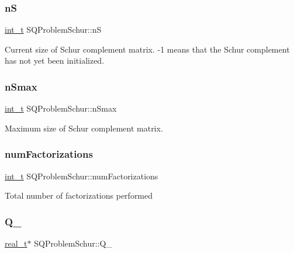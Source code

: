 \subsubsection{\texorpdfstring{nS}{nS}}
{\footnotesize\ttfamily \hyperlink{_types_8hpp_ab6fd6105e64ed14a0c9281326f05e623}{int\+\_\+t} S\+Q\+Problem\+Schur\+::nS\hspace{0.3cm}{\ttfamily [protected]}}

Current size of Schur complement matrix. -\/1 means that the Schur complement has not yet been initialized. \mbox{\label{class_s_q_problem_schur_ae21ef6e09c14c15a1b3aa9e6b5aa3104}} 
\subsubsection{\texorpdfstring{n\+Smax}{nSmax}}
{\footnotesize\ttfamily \hyperlink{_types_8hpp_ab6fd6105e64ed14a0c9281326f05e623}{int\+\_\+t} S\+Q\+Problem\+Schur\+::n\+Smax\hspace{0.3cm}{\ttfamily [protected]}}

Maximum size of Schur complement matrix. \mbox{\label{class_s_q_problem_schur_a5c4cad8c95212332d6eefcef4e39eec8}} 
\subsubsection{\texorpdfstring{num\+Factorizations}{numFactorizations}}
{\footnotesize\ttfamily \hyperlink{_types_8hpp_ab6fd6105e64ed14a0c9281326f05e623}{int\+\_\+t} S\+Q\+Problem\+Schur\+::num\+Factorizations\hspace{0.3cm}{\ttfamily [protected]}}

Total number of factorizations performed \mbox{\label{class_s_q_problem_schur_a9cfbb90b9a1b4988720317f1c3bfb82f}} 
\subsubsection{\texorpdfstring{Q\+\_\+}{Q\_}}
{\footnotesize\ttfamily \hyperlink{qp_o_a_s_e_s__wrapper_8h_a0d00e2b3dfadee81331bbb39068570c4}{real\+\_\+t}$\ast$ S\+Q\+Problem\+Schur\+::\+Q\+\_\+\hspace{0.3cm}{\ttfamily [protected]}}

